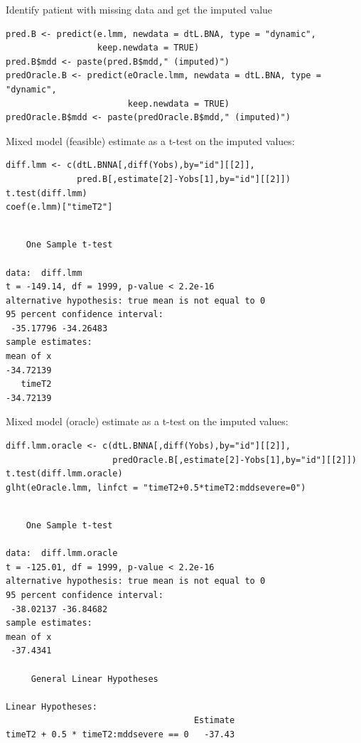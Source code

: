 \documentclass[12pt]{article}
\begin{document}
Identify patient with missing data and get the imputed value
\lstset{language=r,label= ,caption= ,captionpos=b,numbers=none}
\begin{lstlisting}
pred.B <- predict(e.lmm, newdata = dtL.BNA, type = "dynamic",
                  keep.newdata = TRUE)
pred.B$mdd <- paste(pred.B$mdd," (imputed)")
predOracle.B <- predict(eOracle.lmm, newdata = dtL.BNA, type = "dynamic",
                        keep.newdata = TRUE)
predOracle.B$mdd <- paste(predOracle.B$mdd," (imputed)")
\end{lstlisting}

Mixed model (feasible) estimate as a t-test on the imputed values:
\lstset{language=r,label= ,caption= ,captionpos=b,numbers=none}
\begin{lstlisting}
diff.lmm <- c(dtL.BNNA[,diff(Yobs),by="id"][[2]],
              pred.B[,estimate[2]-Yobs[1],by="id"][[2]])
t.test(diff.lmm)
coef(e.lmm)["timeT2"]
\end{lstlisting}

\begin{verbatim}

	One Sample t-test

data:  diff.lmm
t = -149.14, df = 1999, p-value < 2.2e-16
alternative hypothesis: true mean is not equal to 0
95 percent confidence interval:
 -35.17796 -34.26483
sample estimates:
mean of x 
-34.72139
   timeT2 
-34.72139
\end{verbatim}

Mixed model (oracle) estimate as a t-test on the imputed values:
\lstset{language=r,label= ,caption= ,captionpos=b,numbers=none}
\begin{lstlisting}
diff.lmm.oracle <- c(dtL.BNNA[,diff(Yobs),by="id"][[2]],
                     predOracle.B[,estimate[2]-Yobs[1],by="id"][[2]])
t.test(diff.lmm.oracle)
glht(eOracle.lmm, linfct = "timeT2+0.5*timeT2:mddsevere=0")

\end{lstlisting}

\begin{verbatim}

	One Sample t-test

data:  diff.lmm.oracle
t = -125.01, df = 1999, p-value < 2.2e-16
alternative hypothesis: true mean is not equal to 0
95 percent confidence interval:
 -38.02137 -36.84682
sample estimates:
mean of x 
 -37.4341

	 General Linear Hypotheses

Linear Hypotheses:
                                     Estimate
timeT2 + 0.5 * timeT2:mddsevere == 0   -37.43
\end{verbatim}
\end{document}
